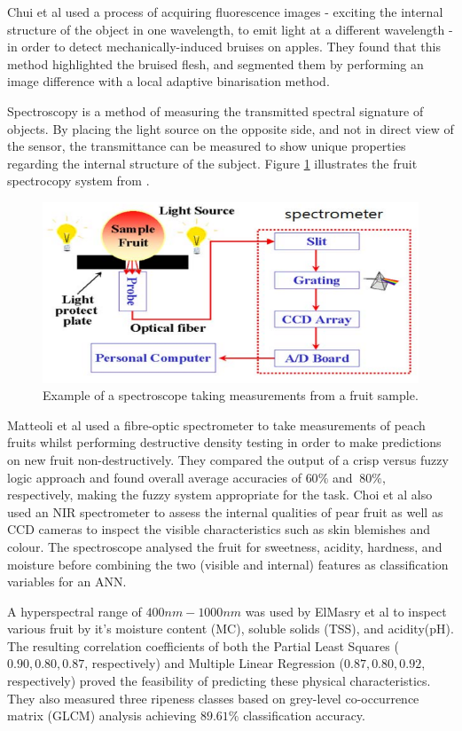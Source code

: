 \documentclass[fleqn,twoside,12pt]{report}
\begin{document}
Chui et al \cite{chiu} used a process of acquiring fluorescence images - exciting the internal structure of the object in one wavelength, to emit light at a different wavelength - in order to detect mechanically-induced bruises on apples. They found that this method highlighted the bruised flesh, and segmented them by performing an image difference with a local adaptive binarisation method. 


Spectroscopy is a method of measuring the transmitted spectral signature of objects. By placing the light source on the opposite side, and not in direct view of the sensor, the transmittance can be measured to show unique properties regarding the internal structure of the subject. Figure \ref{fig:spectroscope} illustrates the fruit spectrocopy system from \cite{choi}. 

\begin{figure}[h]
	\centering
	\includegraphics[width=0.7\linewidth]{spectroscope.png}
	\caption{Example of a spectroscope taking measurements from a fruit sample.}
	\label{fig:spectroscope}
\end{figure}%


Matteoli et al \cite{matteoli} used a fibre-optic spectrometer to take measurements of peach fruits whilst performing destructive density testing in order to make predictions on new fruit non-destructively. They compared the output of a crisp versus fuzzy logic approach and found overall average accuracies of $60\%$ and $~80\%$, respectively, making the fuzzy system appropriate for the task. Choi et al \cite{choi} also used an NIR spectrometer to assess the internal qualities of pear fruit as well as CCD cameras to inspect the visible characteristics such as skin blemishes and colour. The spectroscope analysed the fruit for sweetness, acidity, hardness, and moisture before combining the two (visible and internal) features as classification variables for an ANN. 

A hyperspectral range of $400nm-1000nm$ was used by ElMasry et al \cite{elmasry2} to inspect various fruit by it's moisture content (MC), soluble solids (TSS), and acidity(pH). The resulting correlation coefficients of both the Partial Least Squares ($0.90, 0.80, 0.87$, respectively) and Multiple Linear Regression ($0.87, 0.80, 0.92$, respectively) proved the feasibility of predicting these physical characteristics. They also measured three ripeness classes based on grey-level co-occurrence matrix (GLCM) analysis achieving $89.61\%$ classification accuracy.
\end{document}
